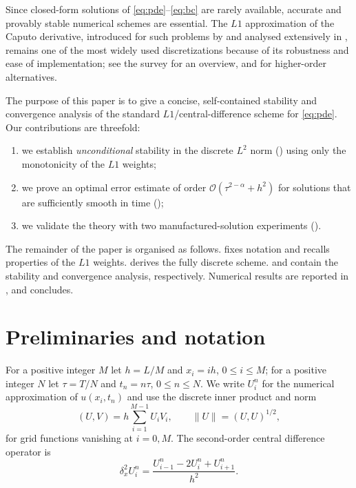 \documentclass[11pt]{ajam}
\newcommand{\norm}[1]{\lVert #1 \rVert}
\begin{document}
Since closed-form solutions of \eqref{eq:pde}--\eqref{eq:bc} are rarely
available, accurate and provably stable numerical schemes are essential.
The $L1$ approximation of the Caputo derivative, introduced for such
problems by \citet{LinXu2007} and analysed extensively in
\citep{SunWu2006,StynesORiordanGracia2017}, remains one of the most widely
used discretizations because of its robustness and ease of implementation;
see the survey \citep{JinLazarovZhou2019} for an overview, and
\citep{Alikhanov2015,GaoSunZhang2014} for higher-order alternatives.

The purpose of this paper is to give a concise, self-contained stability
and convergence analysis of the standard $L1$/central-difference scheme for
\eqref{eq:pde}. Our contributions are threefold:
\begin{enumerate}[label=(\roman*),leftmargin=2.2em]
  \item we establish \emph{unconditional} stability in the discrete $L^2$
        norm () using only the monotonicity of the $L1$
        weights;
  \item we prove an optimal error estimate of order
        $\mathcal{O}(\tau^{2-\alpha}+h^{2})$ for solutions that are
        sufficiently smooth in time ();
  \item we validate the theory with two manufactured-solution experiments
        ().
\end{enumerate}

The remainder of the paper is organised as follows.  fixes
notation and recalls properties of the $L1$ weights. 
derives the fully discrete scheme.  and
 contain the stability and convergence analysis,
respectively. Numerical results are reported in , and
 concludes.

\section{Preliminaries and notation}\label{sec:prelim}
For a positive integer $M$ let $h=L/M$ and $x_i=ih$, $0\le i\le M$; for a
positive integer $N$ let $\tau=T/N$ and $t_n=n\tau$, $0\le n\le N$. We write
$U_i^n$ for the numerical approximation of $u(x_i,t_n)$ and use the discrete
inner product and norm
\begin{equation}\label{eq:disc-norm}
  (U,V) = h\sum_{i=1}^{M-1} U_i V_i,
  \qquad \norm{U} = (U,U)^{1/2},
\end{equation}
for grid functions vanishing at $i=0,M$. The second-order central
difference operator is
\begin{equation}\label{eq:laplace}
  \delta_x^2 U_i^n = \frac{U_{i-1}^n - 2U_i^n + U_{i+1}^n}{h^2}.
\end{equation}
\end{document}

